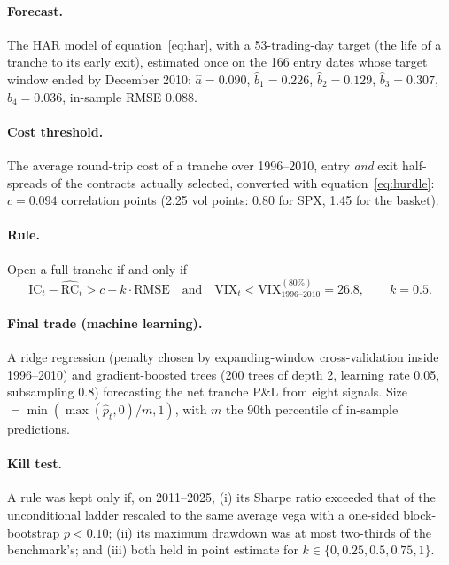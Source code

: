 \paragraph{Forecast.} The HAR model of equation~\eqref{eq:har}, with a 53-trading-day target (the life of a tranche to its early exit), estimated once on the 166 entry dates whose target window ended by December 2010: $\hat a = 0.090$, $\hat b_1 = 0.226$, $\hat b_2 = 0.129$, $\hat b_3 = 0.307$, $\hat b_4 = 0.036$, in-sample RMSE 0.088.

\paragraph{Cost threshold.} The average round-trip cost of a tranche over 1996--2010, entry \emph{and} exit half-spreads of the contracts actually selected, converted with equation~\eqref{eq:hurdle}: $c = 0.094$ correlation points (2.25 vol points: 0.80 for SPX, 1.45 for the basket).

\paragraph{Rule.} Open a full tranche if and only if
\begin{equation}\label{eq:prereg}
  \mathrm{IC}_t - \widehat{\mathrm{RC}}_t > c + k\cdot\mathrm{RMSE} \quad\text{and}\quad \mathrm{VIX}_t < \mathrm{VIX}^{(80\%)}_{1996\text{--}2010} = 26.8, \qquad k = 0.5 .
\end{equation}

\paragraph{Final trade (machine learning).} A ridge regression (penalty chosen by expanding-window cross-validation inside 1996--2010) and gradient-boosted trees (200 trees of depth 2, learning rate 0.05, subsampling 0.8) forecasting the net tranche P\&L from eight signals. Size $= \min(\max(\hat p_t, 0)/m, 1)$, with $m$ the 90th percentile of in-sample predictions.

\paragraph{Kill test.} A rule was kept only if, on 2011--2025, (i) its Sharpe ratio exceeded that of the unconditional ladder rescaled to the same average vega with a one-sided block-bootstrap $p < 0.10$; (ii) its maximum drawdown was at most two-thirds of the benchmark's; and (iii) both held in point estimate for $k \in \{0, 0.25, 0.5, 0.75, 1\}$.

